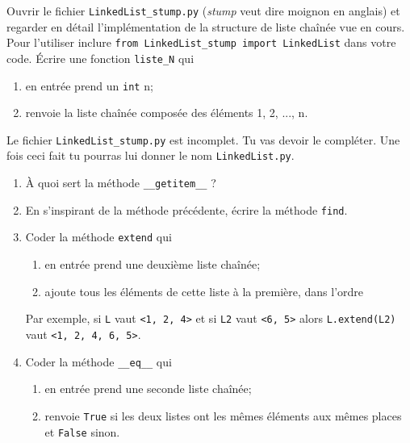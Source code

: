 \documentclass[a4paper,12pt,french]{article}
\begin{document}

\begin{exercice}
Ouvrir le fichier \texttt{LinkedList\_stump.py} (\textit{stump} veut dire moignon en anglais) et regarder en détail l'implémentation de la structure de liste chaînée vue en cours.\\
Pour l'utiliser inclure \texttt{from LinkedList_stump import LinkedList} dans votre code.
    \'Ecrire une fonction \texttt{liste_N} qui
    \begin{enumerate}[--]
        \item en entrée prend un \texttt{int} n;
        \item renvoie la liste chaînée composée des éléments 1, 2, ..., n.
    \end{enumerate}
\end{exercice}
\begin{exercice}
Le fichier \texttt{LinkedList\_stump.py}  est incomplet. Tu vas devoir le compléter. Une fois ceci fait tu pourras lui donner le nom \texttt{LinkedList.py}.
\begin{enumerate}
    \item À quoi sert la méthode \texttt{__getitem__} ?
    \item En s'inspirant de la méthode précédente, écrire la méthode \texttt{find}.
    \item Coder la méthode \texttt{extend} qui
          \begin{enumerate}[--]
              \item en entrée prend une deuxième liste chaînée;
              \item ajoute tous les éléments de cette liste à la première, dans l'ordre
          \end{enumerate}
            Par exemple, si \texttt{L} vaut \texttt{<1, 2, 4>} et si \texttt{L2} vaut \texttt{<6, 5>} alors \texttt{L.extend(L2)} vaut \texttt{<1, 2, 4, 6, 5>}.
     \item Coder la méthode \texttt{__eq__} qui
     \begin{enumerate}[--]
         \item en entrée prend une seconde liste chaînée;
         \item renvoie \texttt{True} si les deux listes ont les mêmes éléments aux mêmes places et \texttt{False} sinon.
     \end{enumerate}
\end{enumerate}
\end{exercice}
\end{document}
